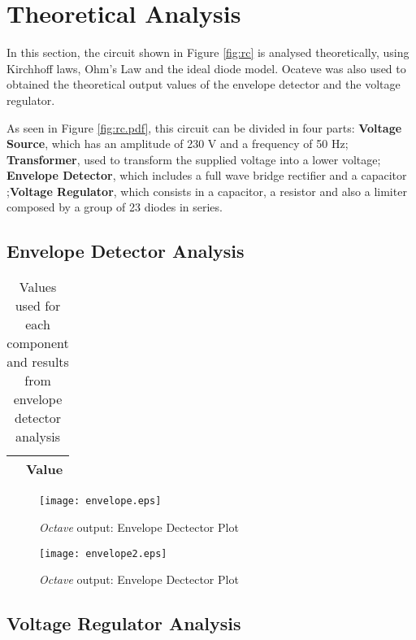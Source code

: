\section{Theoretical Analysis} \label{sec:analysis}

In this section, the circuit shown in Figure \ref{fig:rc} is analysed theoretically, using Kirchhoff laws, Ohm's Law and the ideal diode model.
Ocateve was also used to obtained the theoretical output values of the envelope detector and the voltage regulator. 

As seen in Figure \ref{fig:rc.pdf}, this circuit can be divided in four parts: \textbf{Voltage Source}, which has an amplitude of 230 V and a frequency of 50 Hz; \textbf{Transformer}, used to transform the supplied voltage into a lower voltage; \textbf{Envelope Detector}, which includes a full wave bridge rectifier and a capacitor ;\textbf{Voltage Regulator}, which consists in a capacitor, a resistor and also a limiter composed by a group of 23 diodes in series.

\subsection{Envelope Detector Analysis}

\begin{table}[h]
  \centering
  \begin{tabular}{|c|c|}
    \hline    
     & { Value } \\ \hline
    
 \end{tabular}
 \caption{Values used for each component and results from envelope detector analysis}
  \label{tab:op}
\end{table}

\begin{figure}[h]
    \centering
    \texttt{[image: envelope.eps]}
    \caption{{\it Octave} output: Envelope Dectector Plot}
    \label{fig:OctaveOut}
\end{figure}

\begin{figure}[h]
    \centering
    \texttt{[image: envelope2.eps]}
    \caption{{\it Octave} output: Envelope Dectector Plot}
    \label{fig:OctaveOut}
\end{figure}



\subsection{Voltage Regulator Analysis}

